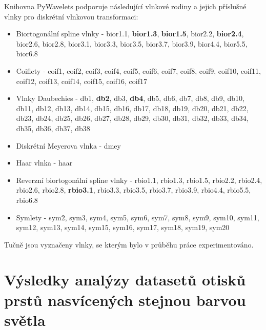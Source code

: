 Knihovna PyWavelets podporuje následující vlnkové rodiny a jejich příslušné vlnky pro diskrétní vlnkovou transformaci:
\begin{itemize}
    \item Biortogonální spline vlnky - bior1.1, \textbf{bior1.3}, \textbf{bior1.5}, bior2.2, \textbf{bior2.4}, bior2.6, bior2.8, bior3.1, bior3.3, bior3.5, bior3.7, bior3.9, bior4.4, bior5.5, bior6.8
    \item Coiflety - coif1, coif2, coif3, coif4, coif5, coif6, coif7, coif8, coif9, coif10, coif11, coif12, coif13, coif14, coif15, coif16, coif17
    \item Vlnky Daubechies - db1, \textbf{db2}, db3, \textbf{db4}, db5, db6, db7, db8, db9, db10, db11, db12, db13, db14, db15, db16, db17, db18, db19, db20, db21, db22, db23, db24, db25, db26, db27, db28, db29, db30, db31, db32, db33, db34, db35, db36, db37, db38
    \item Diskrétní Meyerova vlnka - dmey
    \item Haar vlnka - haar
    \item Reverzní biortogonální spline vlnky - rbio1.1, rbio1.3, rbio1.5, rbio2.2, rbio2.4, rbio2.6, rbio2.8, \textbf{rbio3.1}, rbio3.3, rbio3.5, rbio3.7, rbio3.9, rbio4.4, rbio5.5, rbio6.8
    \item Symlety - sym2, sym3, sym4, sym5, sym6, sym7, sym8, sym9, sym10, sym11, sym12, sym13, sym14, sym15, sym16, sym17, sym18, sym19, sym20
\end{itemize}

Tučně jsou vyznačeny vlnky, se kterým bylo v průběhu práce experimentováno.




\chapter{Výsledky analýzy datasetů otisků prstů nasvícených stejnou barvou světla}

